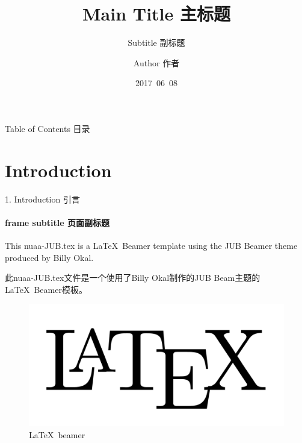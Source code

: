 \documentclass[CJKutf8]{beamer}
\begin{document}
\begin{CJK*}{UTF8}{gbsn} %

  \title{Main Title 主标题}
  \subtitle{Subtitle 副标题} %
  \author{Author 作者}
  \date{2017\ 06\ 08}

  \begin{frame}[plain,t]
    \titlepage
  \end{frame} %
  
  \begin{frame}{Table of Contents 目录}
    \tableofcontents
  \end{frame} %
  
  \section{Introduction}
  \label{Sec:introduction}
  \begin{frame}{1. Introduction 引言}
    \framesubtitle{frame subtitle 页面副标题}
    This nuaa-JUB.tex is a \LaTeX \ Beamer template using the JUB Beamer theme \cite{JUBTheme} produced by Billy Okal.

    \bigskip

    此nuaa-JUB.tex文件是一个使用了Billy Okal制作的JUB Beam主题\cite{JUBTheme}的\LaTeX \ Beamer模板。

    \begin{figure}
      \begin{center}
        \includegraphics[scale=0.1]{latex.png}
      \end{center}
      \caption{\LaTeX \ beamer}
      \label{Fig:latex_beamer}
    \end{figure}
  \end{frame} %


\end{CJK*}
\end{document}
